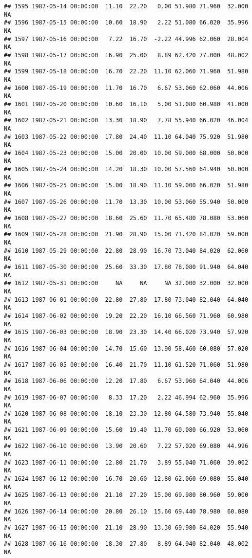 \documentclass{article}\usepackage{graphicx, color}
\makeatletter
\newenvironment{kframe}{%
 \def\at@end@of@kframe{}%
 \ifinner\ifhmode%
  \def\at@end@of@kframe{\end{minipage}}%
  \begin{minipage}{\columnwidth}%
 \fi\fi%
 \def\FrameCommand##1{\hskip\@totalleftmargin \hskip-\fboxsep
 \colorbox{shadecolor}{##1}\hskip-\fboxsep
     \hskip-\linewidth \hskip-\@totalleftmargin \hskip\columnwidth}%
 \MakeFramed {\advance\hsize-\width
   \@totalleftmargin\z@ \linewidth\hsize
   \@setminipage}}%
 {\par\unskip\endMakeFramed%
 \at@end@of@kframe}
\newenvironment{knitrout}{}{} %
\makeatother
\begin{document}
\begin{knitrout}
\begin{kframe}
\begin{verbatim}
## 1595 1987-05-14 00:00:00  11.10  22.20   0.00 51.980 71.960  32.000     NA
## 1596 1987-05-15 00:00:00  10.60  18.90   2.22 51.080 66.020  35.996     NA
## 1597 1987-05-16 00:00:00   7.22  16.70  -2.22 44.996 62.060  28.004     NA
## 1598 1987-05-17 00:00:00  16.90  25.00   8.89 62.420 77.000  48.002     NA
## 1599 1987-05-18 00:00:00  16.70  22.20  11.10 62.060 71.960  51.980     NA
## 1600 1987-05-19 00:00:00  11.70  16.70   6.67 53.060 62.060  44.006     NA
## 1601 1987-05-20 00:00:00  10.60  16.10   5.00 51.080 60.980  41.000     NA
## 1602 1987-05-21 00:00:00  13.30  18.90   7.78 55.940 66.020  46.004     NA
## 1603 1987-05-22 00:00:00  17.80  24.40  11.10 64.040 75.920  51.980     NA
## 1604 1987-05-23 00:00:00  15.00  20.00  10.00 59.000 68.000  50.000     NA
## 1605 1987-05-24 00:00:00  14.20  18.30  10.00 57.560 64.940  50.000     NA
## 1606 1987-05-25 00:00:00  15.00  18.90  11.10 59.000 66.020  51.980     NA
## 1607 1987-05-26 00:00:00  11.70  13.30  10.00 53.060 55.940  50.000     NA
## 1608 1987-05-27 00:00:00  18.60  25.60  11.70 65.480 78.080  53.060     NA
## 1609 1987-05-28 00:00:00  21.90  28.90  15.00 71.420 84.020  59.000     NA
## 1610 1987-05-29 00:00:00  22.80  28.90  16.70 73.040 84.020  62.060     NA
## 1611 1987-05-30 00:00:00  25.60  33.30  17.80 78.080 91.940  64.040     NA
## 1612 1987-05-31 00:00:00     NA     NA     NA 32.000 32.000  32.000     NA
## 1613 1987-06-01 00:00:00  22.80  27.80  17.80 73.040 82.040  64.040     NA
## 1614 1987-06-02 00:00:00  19.20  22.20  16.10 66.560 71.960  60.980     NA
## 1615 1987-06-03 00:00:00  18.90  23.30  14.40 66.020 73.940  57.920     NA
## 1616 1987-06-04 00:00:00  14.70  15.60  13.90 58.460 60.080  57.020     NA
## 1617 1987-06-05 00:00:00  16.40  21.70  11.10 61.520 71.060  51.980     NA
## 1618 1987-06-06 00:00:00  12.20  17.80   6.67 53.960 64.040  44.006     NA
## 1619 1987-06-07 00:00:00   8.33  17.20   2.22 46.994 62.960  35.996     NA
## 1620 1987-06-08 00:00:00  18.10  23.30  12.80 64.580 73.940  55.040     NA
## 1621 1987-06-09 00:00:00  15.60  19.40  11.70 60.080 66.920  53.060     NA
## 1622 1987-06-10 00:00:00  13.90  20.60   7.22 57.020 69.080  44.996     NA
## 1623 1987-06-11 00:00:00  12.80  21.70   3.89 55.040 71.060  39.002     NA
## 1624 1987-06-12 00:00:00  16.70  20.60  12.80 62.060 69.080  55.040     NA
## 1625 1987-06-13 00:00:00  21.10  27.20  15.00 69.980 80.960  59.000     NA
## 1626 1987-06-14 00:00:00  20.80  26.10  15.60 69.440 78.980  60.080     NA
## 1627 1987-06-15 00:00:00  21.10  28.90  13.30 69.980 84.020  55.940     NA
## 1628 1987-06-16 00:00:00  18.30  27.80   8.89 64.940 82.040  48.002     NA

\end{verbatim}
\end{kframe}
\end{knitrout}
\end{document}
